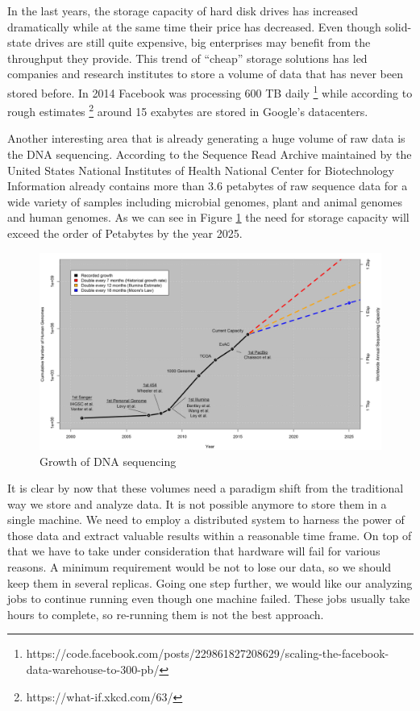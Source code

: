 In the last years, the storage capacity of hard disk drives has
increased dramatically while at the same time their price has
decreased. Even though solid-state drives are still quite expensive,
big enterprises may benefit from the throughput they provide. This
trend of ``cheap'' storage solutions has led companies and research
institutes to store a volume of data that has never been stored
before. In 2014 Facebook was processing 600 TB daily
\footnote{https://code.facebook.com/posts/229861827208629/scaling-the-facebook-data-warehouse-to-300-pb/}
while according to rough estimates
\footnote{https://what-if.xkcd.com/63/} around 15 exabytes are stored
in Google's datacenters.

Another interesting area that is already generating a huge volume of
raw data is the DNA sequencing. According to \cite{10.1371/journal.pbio.1002195} the Sequence
Read Archive maintained by the United States National Institutes of Health
National Center for Biotechnology Information already contains more
than 3.6 petabytes of raw sequence data for a wide variety of samples
including microbial genomes, plant and animal genomes and human
genomes. As we can see in Figure \ref{fig:intro_genomics_growth} the
need for storage capacity will exceed the order of Petabytes by the
year 2025.

\begin{figure}
\centering
\includegraphics[scale=0.5]{resources/images/Introduction/genomics_growth.png}
\caption{Growth of DNA sequencing \cite{10.1371/journal.pbio.1002195}}
\label{fig:intro_genomics_growth}
\end{figure}

It is clear by now that these volumes need a paradigm shift
from the traditional way we store and analyze data. It is not possible
anymore to store them in a single machine. We need to employ a
distributed system to harness the power of those data and extract
valuable results within a reasonable time frame. On top of that we have
to take under consideration that hardware will fail for various
reasons. A minimum requirement would be not to lose our data, so we
should keep them in several replicas. Going one step further, we would
like our analyzing jobs to continue running even though one machine failed. These
jobs usually take hours to complete, so re-running them is not the
best approach.
